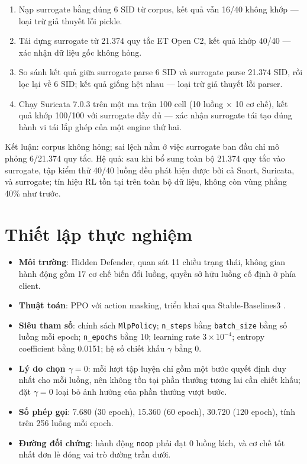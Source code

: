 \documentclass[12pt, a4paper, openany]{book}
\begin{document}
\begin{enumerate}
    \item Nạp surrogate bằng đúng 6 SID từ corpus, kết quả vẫn 16/40 không khớp --- loại trừ giả thuyết lỗi pickle.
    \item Tái dựng surrogate từ 21.374 quy tắc ET Open C2, kết quả khớp 40/40 --- xác nhận dữ liệu gốc không hỏng.
    \item So sánh kết quả giữa surrogate parse 6 SID và surrogate parse 21.374 SID, rồi lọc lại về 6 SID; kết quả giống hệt nhau --- loại trừ giả thuyết lỗi parser.
    \item Chạy Suricata 7.0.3 trên một ma trận 100 cell (10 luồng × 10 cơ chế), kết quả khớp 100/100 với surrogate đầy đủ --- xác nhận surrogate tái tạo đúng hành vi tái lắp ghép của một engine thứ hai.
\end{enumerate}

Kết luận: corpus không hỏng; sai lệch nằm ở việc surrogate ban đầu chỉ mô phỏng 6/21.374 quy tắc. Hệ quả: sau khi bổ sung toàn bộ 21.374 quy tắc vào surrogate, tập kiểm thử 40/40 luồng đều phát hiện được bởi cả Snort, Suricata, và surrogate; tín hiệu RL tồn tại trên toàn bộ dữ liệu, không còn vùng phẳng 40\% như trước.

\section{Thiết lập thực nghiệm}

\begin{itemize}
    \item \textbf{Môi trường}: Hidden Defender, quan sát 11 chiều trạng thái, không gian hành động gồm 17 cơ chế biến đổi luồng, quyền sở hữu luồng cố định ở phía client.
    \item \textbf{Thuật toán}: PPO \cite{ppo} với action masking, triển khai qua Stable-Baselines3 \cite{sb3}.
    \item \textbf{Siêu tham số}: chính sách \texttt{MlpPolicy}; \texttt{n\_steps} bằng \texttt{batch\_size} bằng số luồng mỗi epoch; \texttt{n\_epochs} bằng 10; learning rate $3\times 10^{-4}$; entropy coefficient bằng 0.0151; hệ số chiết khấu $\gamma$ bằng 0.
    \item \textbf{Lý do chọn $\gamma=0$}: mỗi lượt tập luyện chỉ gồm một bước quyết định duy nhất cho mỗi luồng, nên không tồn tại phần thưởng tương lai cần chiết khấu; đặt $\gamma=0$ loại bỏ ảnh hưởng của phần thưởng vượt bước.
    \item \textbf{Số phép gọi}: 7.680 (30 epoch), 15.360 (60 epoch), 30.720 (120 epoch), tính trên 256 luồng mỗi epoch.
    \item \textbf{Đường đối chứng}: hành động \texttt{noop} phải đạt 0 luồng lách, và cơ chế tốt nhất đơn lẻ đóng vai trò đường trần dưới.
\end{itemize}
\end{document}
